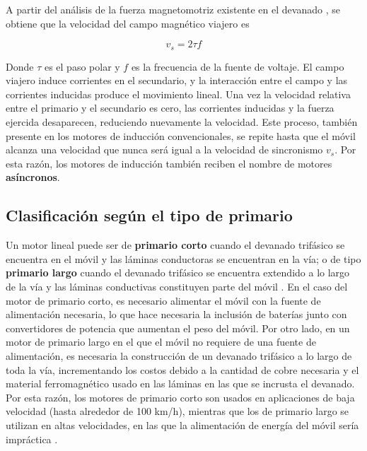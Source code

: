 A partir del análisis de la fuerza magnetomotriz existente en el devanado \cite{boldea2013}, se obtiene que la velocidad del campo magnético viajero es

\begin{equation}
v_s = 2\tau f
\end{equation}

Donde $\tau$ es el paso polar y $f$ es la frecuencia de la fuente de voltaje. El campo viajero induce corrientes en el secundario, y la interacción entre el campo y las corrientes inducidas produce el movimiento lineal. Una vez la velocidad relativa entre el primario y el secundario es cero, las corrientes inducidas y la fuerza ejercida desaparecen, reduciendo nuevamente la velocidad. Este proceso, también presente en los motores de inducción convencionales, se repite hasta que el móvil alcanza una velocidad que nunca será igual a la velocidad de sincronismo $v_s$. Por esta razón, los motores de inducción también reciben el nombre de motores \textbf{asíncronos}.

\subsection{Clasificación según el tipo de primario}
Un motor lineal puede ser de \textbf{primario corto} cuando el devanado trifásico se encuentra en el móvil y las láminas conductoras se encuentran en la vía; o de tipo \textbf{primario largo} cuando el devanado trifásico se encuentra extendido a lo largo de la vía y las láminas conductivas constituyen parte del móvil \cite{laithwaite1970}. En el caso del motor de primario corto, es necesario alimentar el móvil con la fuente de alimentación necesaria, lo que hace necesaria la inclusión de baterías junto con convertidores de potencia que aumentan el peso del móvil. Por otro lado, en un motor de primario largo en el que el móvil no requiere de una fuente de alimentación, es necesaria la construcción de un devanado trifásico a lo largo de toda la vía, incrementando los costos debido a la cantidad de cobre necesaria y el material ferromagnético usado en las láminas en las que se incrusta el devanado. Por esta razón, los motores de primario corto son usados en aplicaciones de baja velocidad (hasta alrededor de 100 km/h), mientras que los de primario largo se utilizan en altas velocidades, en las que la alimentación de energía del móvil sería impráctica \cite{leekimlee2006}.

